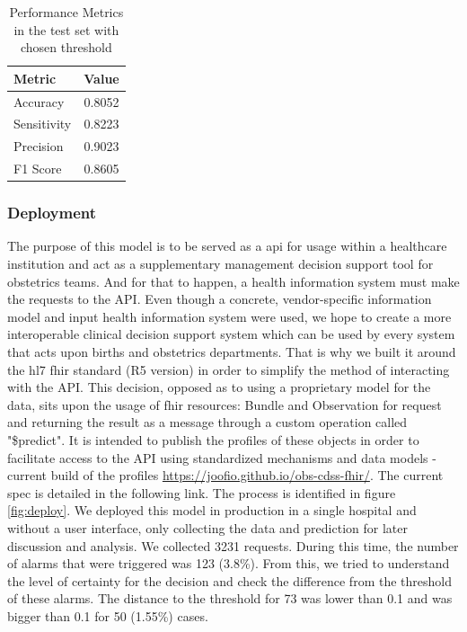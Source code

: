 \begin{table}[htbp]
  \centering
\caption{Performance Metrics in the test set with chosen threshold}
\label{tab:performancemetricsthreshold}
\renewcommand{\arraystretch}{1.5} %
\setlength{\tabcolsep}{12pt} %
\begin{tabular}{lc}
    \hline
    \textbf{Metric} & \textbf{Value} \\
    \hline
    Accuracy & 0.8052 \\
    Sensitivity & 0.8223 \\
    Precision & 0.9023 \\
    F1 Score & 0.8605 \\
    \hline
  \end{tabular}
\end{table}




\subsubsection{Deployment}
The purpose of this model is to be served as a \ac{api} for usage within a healthcare institution and act as a supplementary management decision support tool for obstetrics teams. And for that to happen, a health information system must make the requests to the API. Even though a concrete, vendor-specific information model and input health information system were used, we hope to create a more interoperable clinical decision support system which can be used by every system that acts upon births and obstetrics departments. That is why we built it around the \ac{hl7} \ac{fhir} standard (R5 version) in order to simplify the method of interacting with the API. This decision, opposed as to using a proprietary model for the data, sits upon the usage of \ac{fhir} resources: Bundle and Observation for request and returning the result as a message through a custom operation called "\$predict". It is intended to publish the profiles of these objects in order to facilitate access to the API using standardized mechanisms and data models - current build of the profiles \url{https://joofio.github.io/obs-cdss-fhir/}. The current spec is detailed in the following link. The process is identified in figure \ref{fig:deploy}.
We deployed this model in production in a single hospital and without a user interface, only collecting the data and prediction for later discussion and analysis. We collected 3231 requests. During this time, the number of alarms that were triggered was 123 (3.8\%). From this, we tried to understand the level of certainty for the decision and check the difference from the threshold of these alarms. The distance to the threshold for 73 was lower than 0.1 and was bigger than 0.1 for 50 (1.55\%) cases.

